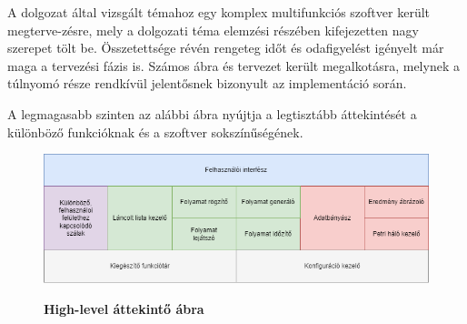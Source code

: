 
A dolgozat által vizsgált témahoz egy komplex multifunkciós szoftver került megterve\hyp{}zésre, mely a dolgozati téma elemzési részében kifejezetten nagy szerepet tölt be. Összetettsége révén rengeteg időt és odafigyelést igényelt már maga a tervezési fázis is. Számos ábra és tervezet került megalkotásra, melynek a túlnyomó része rendkívül jelentősnek bizonyult az implementáció során.


A legmagasabb szinten az alábbi ábra nyújtja a legtisztább áttekintését a különböző funkcióknak és a szoftver sokszínűségének.

\begin{figure}[h!]
\begin{center}
\caption{\textbf{High-level áttekintő ábra}}
\includegraphics[width=\textwidth,keepaspectratio=true]{images/img_plan_1}
\label{fig:plan}
\end{center}
\end{figure}

